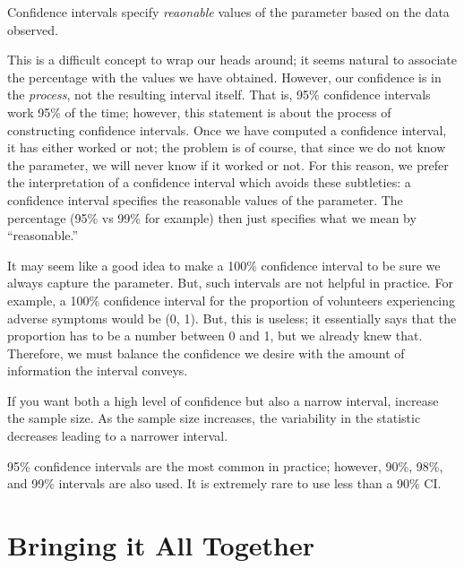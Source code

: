 \documentclass[
]{book}
\theoremstyle{plain}
\theoremstyle{mydefn}
\theoremstyle{myexmpl}
\theoremstyle{remark}
\begin{document}
\begin{rmdkeyidea}
Confidence intervals specify \emph{reaonable} values of the parameter based on the data observed.
\end{rmdkeyidea}

This is a difficult concept to wrap our heads around; it seems natural to associate the percentage with the values we have obtained. However, our confidence is in the \emph{process}, not the resulting interval itself. That is, 95\% confidence intervals work 95\% of the time; however, this statement is about the process of constructing confidence intervals. Once we have computed a confidence interval, it has either worked or not; the problem is of course, that since we do not know the parameter, we will never know if it worked or not. For this reason, we prefer the interpretation of a confidence interval which avoids these subtleties: a confidence interval specifies the reasonable values of the parameter. The percentage (95\% vs 99\% for example) then just specifies what we mean by ``reasonable.''

It may seem like a good idea to make a 100\% confidence interval to be sure we always capture the parameter. But, such intervals are not helpful in practice. For example, a 100\% confidence interval for the proportion of volunteers experiencing adverse symptoms would be (0, 1). But, this is useless; it essentially says that the proportion has to be a number between 0 and 1, but we already knew that. Therefore, we must balance the confidence we desire with the amount of information the interval conveys.

\begin{rmdtip}
If you want both a high level of confidence but also a narrow interval, increase the sample size. As the sample size increases, the variability in the statistic decreases leading to a narrower interval.
\end{rmdtip}

\begin{rmdtip}
95\% confidence intervals are the most common in practice; however, 90\%, 98\%, and 99\% intervals are also used. It is extremely rare to use less than a 90\% CI.
\end{rmdtip}

\hypertarget{bringing-it-all-together}{%
\section{Bringing it All Together}\label{bringing-it-all-together}}
\end{document}
